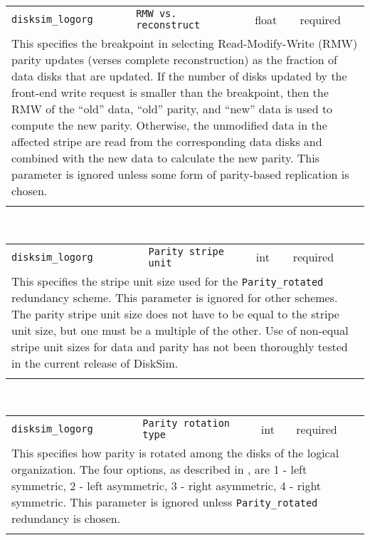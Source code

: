 \noindent 
\begin{tabular}{|p{\lpmodwidth}|p{\lpnamewidth}|p{0.5in}|p{0.5in}|}
\cline{1-4}
\texttt{disksim\_logorg} & \texttt{RMW vs. reconstruct} & float & required \\ 
\cline{1-4}
\multicolumn{4}{|p{6in}|}{
This specifies the breakpoint in selecting Read-Modify-Write (RMW) parity
updates (verses complete reconstruction) as the fraction of data disks
that are updated. If the number of disks updated by the front-end
write request is smaller than the breakpoint, then the RMW of the
``old'' data, ``old'' parity, and ``new'' data is used to compute the
new parity. Otherwise, the unmodified data in the affected stripe are
read from the corresponding data disks and combined with the new data
to calculate the new parity. This parameter is ignored unless some
form of parity-based replication is chosen.
}\\ 
\cline{1-4}
\multicolumn{4}{p{5in}}{}\\
\end{tabular}\\ 
\noindent 
\begin{tabular}{|p{\lpmodwidth}|p{\lpnamewidth}|p{0.5in}|p{0.5in}|}
\cline{1-4}
\texttt{disksim\_logorg} & \texttt{Parity stripe unit} & int & required \\ 
\cline{1-4}
\multicolumn{4}{|p{6in}|}{
This specifies the stripe unit size used for the \texttt{Parity\_rotated}
redundancy scheme. This parameter is ignored for other schemes. The
parity stripe unit size does not have to be equal to the stripe unit
size, but one must be a multiple of the other. Use of non-equal
stripe unit sizes for data and parity has not been thoroughly tested
in the current release of DiskSim.
}\\ 
\cline{1-4}
\multicolumn{4}{p{5in}}{}\\
\end{tabular}\\ 
\noindent 
\begin{tabular}{|p{\lpmodwidth}|p{\lpnamewidth}|p{0.5in}|p{0.5in}|}
\cline{1-4}
\texttt{disksim\_logorg} & \texttt{Parity rotation type} & int & required \\ 
\cline{1-4}
\multicolumn{4}{|p{6in}|}{
This specifies how parity is rotated
among the disks of the logical organization. The four options, as
described in \cite{Lee91}, are
1 - left symmetric,
2 - left asymmetric,
3 - right asymmetric,
4 - right symmetric.
This parameter is ignored unless \texttt{Parity\_rotated} redundancy is
chosen.
}\\ 
\cline{1-4}
\multicolumn{4}{p{5in}}{}\\
\end{tabular}\\ 
